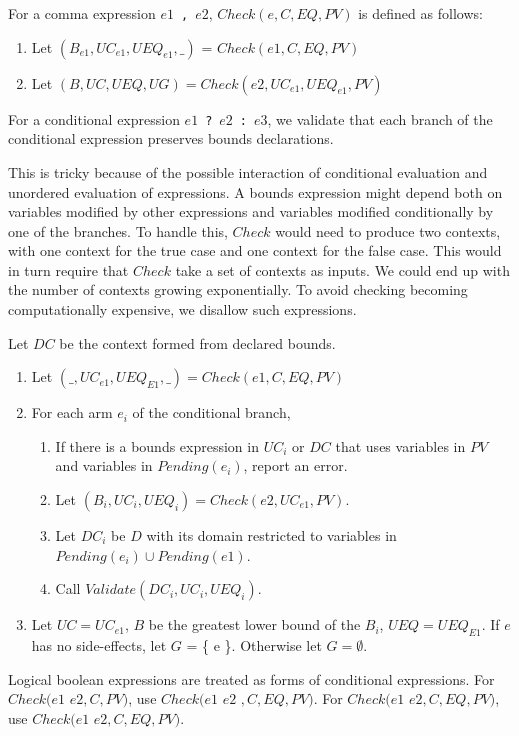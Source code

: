 For a comma expression $e1$~\lstinline|,|~$e2$, $Check(e, C, EQ, PV)$ is defined as follows:
\begin{enumerate}
\item Let $(B_{e1}, {UC}_{e1}, {UEQ}_{e1}, \_)$ = $Check(e1, C, EQ, PV)$
\item Let $(B, UC, UEQ, UG) = Check(e2, {UC}_{e1}, {UEQ}_{e1}, PV)$
\end{enumerate}

For a conditional expression $e1$~\lstinline+?+~$e2$~\lstinline+:+~$e3$, we validate that each branch
of the conditional expression preserves bounds declarations.

This is tricky
because of the possible interaction of conditional evaluation and unordered evaluation
of expressions.  A bounds expression might depend both on variables modified 
by other expressions and variables modified conditionally by one of the
branches.  To handle this, $Check$ would need to produce two  contexts, with
one context for the true case and one context for the false case.   This would in turn
require that $Check$ take a set of contexts as inputs.  We could end up with the
number of contexts growing exponentially.  To avoid checking becoming computationally
expensive, we disallow such expressions.

Let $DC$ be the context formed from declared bounds.
\begin{enumerate}
\item Let $(\_, {UC}_{e1}, {UEQ}_{E1}, \_)= Check(e1, C, EQ, PV)$
\item For each arm $e_i$ of the conditional branch,
\begin{enumerate}
\item If there is a bounds expression in ${UC}_i$ or $DC$ that uses variables in $PV$ and
variables in $Pending(e_i)$, report an error.
\item Let $(B_i, {UC}_i, {UEQ}_i) = Check(e2, {UC}_{e1}, PV)$.
\item Let $DC_i$ be $D$ with its domain restricted to variables in $Pending(e_i) \cup Pending(e1)$. 
\item Call $Validate(DC_i, {UC}_i, {UEQ}_i)$.
\end{enumerate}
\item Let $UC = {UC}_{e1}$, $B$ be the greatest lower bound of the $B_i$, $UEQ = {UEQ}_{E1}$.
If $e$ has no side-effects, let $G$ = \{ e \}.  Otherwise let $G=\emptyset$.
\end{enumerate}

Logical boolean expressions are treated as forms of conditional expressions.
For  $Check(e1$ \code{&&} $ e2, C, PV)$, use $Check(e1$  $e2$ $, C, EQ, PV)$.  For
$Check(e1$ \code{ \|\| } $ e2, C, EQ, PV)$,  use $Check(e1 $  $e2, C, EQ, PV)$.

